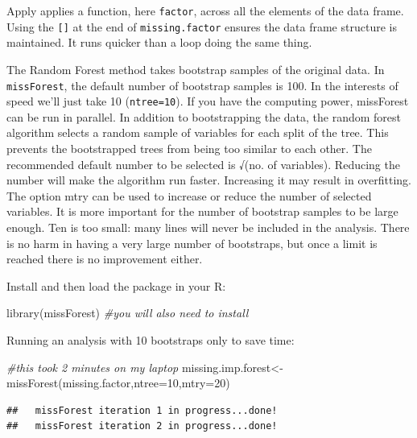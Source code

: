 \documentclass[
]{book}
\newenvironment{Shaded}{\begin{snugshade}}{\end{snugshade}}
\newcommand{\AttributeTok}[1]{\textcolor[rgb]{0.77,0.63,0.00}{#1}}
\newcommand{\CommentTok}[1]{\textcolor[rgb]{0.56,0.35,0.01}{\textit{#1}}}
\newcommand{\DecValTok}[1]{\textcolor[rgb]{0.00,0.00,0.81}{#1}}
\newcommand{\FunctionTok}[1]{\textcolor[rgb]{0.00,0.00,0.00}{#1}}
\newcommand{\NormalTok}[1]{#1}
\newcommand{\OtherTok}[1]{\textcolor[rgb]{0.56,0.35,0.01}{#1}}
\begin{document}
Apply applies a function, here \texttt{factor}, across all the elements of the data frame. Using the \texttt{{[}{]}} at the end of \texttt{missing.factor} ensures the data frame structure is maintained. It runs quicker than a loop doing the same thing.

The Random Forest method takes bootstrap samples of the original data. In \texttt{missForest}, the default number of bootstrap samples is 100. In the interests of speed we'll just take 10 (\texttt{ntree=10}). If you have the computing power, missForest can be run in parallel. In addition to bootstrapping the data, the random forest algorithm selects a random sample of variables for each split of the tree. This prevents the bootstrapped trees from being too similar to each other. The recommended default number to be selected is √(no. of variables). Reducing the number will make the algorithm run faster. Increasing it may result in overfitting. The option mtry can be used to increase or reduce the number of selected variables. It is more important for the number of bootstrap samples to be large enough. Ten is too small: many lines will never be included in the analysis. There is no harm in having a very large number of bootstraps, but once a limit is reached there is no improvement either.

Install and then load the package in your R:

\begin{Shaded}
\begin{Highlighting}[]
\FunctionTok{library}\NormalTok{(missForest) }\CommentTok{\#you will also need to install}
\end{Highlighting}
\end{Shaded}

Running an analysis with 10 bootstraps only to save time:

\begin{Shaded}
\begin{Highlighting}[]
\CommentTok{\#this took 2 minutes on my laptop}
\NormalTok{missing.imp.forest}\OtherTok{\textless{}{-}}\FunctionTok{missForest}\NormalTok{(missing.factor,}\AttributeTok{ntree=}\DecValTok{10}\NormalTok{,}\AttributeTok{mtry=}\DecValTok{20}\NormalTok{)}
\end{Highlighting}
\end{Shaded}

\begin{verbatim}
##   missForest iteration 1 in progress...done!
##   missForest iteration 2 in progress...done!
\end{verbatim}
\end{document}
